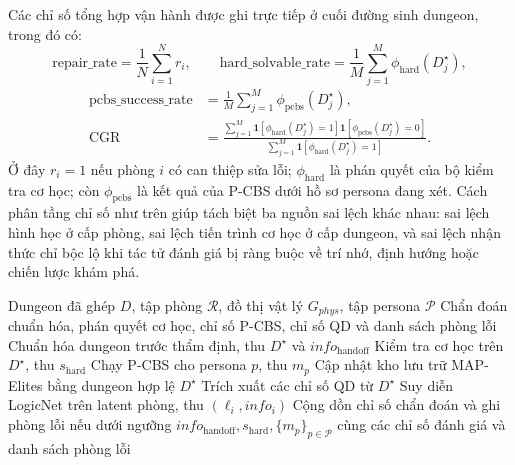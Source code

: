 \documentclass[oneside,a4paper,12pt]{extreport}
\begin{document}
Các chỉ số tổng hợp vận hành được ghi trực tiếp ở cuối đường sinh dungeon, trong đó có:
\begin{equation}
\mathrm{repair\_rate}=\frac{1}{N}\sum_{i=1}^{N} r_i,
\qquad
\mathrm{hard\_solvable\_rate}=\frac{1}{M}\sum_{j=1}^{M}\phi_{\mathrm{hard}}(D_j^{\star}),
\end{equation}
\begin{equation}
\begin{aligned}
\mathrm{pcbs\_success\_rate}
&=\frac{1}{M}\sum_{j=1}^{M}\phi_{\mathrm{pcbs}}(D_j^{\star}),\\
\mathrm{CGR}
&=
\frac{
\sum_{j=1}^{M}
\mathbf{1}\!\left[\phi_{\mathrm{hard}}(D_j^{\star})=1\right]
\mathbf{1}\!\left[\phi_{\mathrm{pcbs}}(D_j^{\star})=0\right]
}{
\sum_{j=1}^{M}\mathbf{1}\!\left[\phi_{\mathrm{hard}}(D_j^{\star})=1\right]
}.
\end{aligned}
\end{equation}
Ở đây $r_i=1$ nếu phòng $i$ có can thiệp sửa lỗi; $\phi_{\mathrm{hard}}$ là phán
quyết của bộ kiểm tra cơ học; còn $\phi_{\mathrm{pcbs}}$ là kết quả của P-CBS dưới
hồ sơ persona đang xét. Cách phân tầng chỉ số như trên giúp tách biệt ba nguồn
sai lệch khác nhau: sai lệch hình học ở cấp phòng, sai lệch tiến trình cơ học ở
cấp dungeon, và sai lệch nhận thức chỉ bộc lộ khi tác tử đánh giá bị ràng buộc
về trí nhớ, định hướng hoặc chiến lược khám phá.

\begin{algorithm}[H]
\caption{Đánh giá dungeon sau ghép với bước chuẩn hóa trước thẩm định, kiểm tra cơ học và P-CBS}
\label{alg:post_generation_evaluation}
\begin{algorithmic}[1]
\Require Dungeon đã ghép $D$, tập phòng $\mathcal{R}$, đồ thị vật lý $G_{phys}$, tập persona $\mathcal{P}$
\Ensure Chẩn đoán chuẩn hóa, phán quyết cơ học, chỉ số P-CBS, chỉ số QD và danh sách phòng lỗi
\State Chuẩn hóa dungeon trước thẩm định, thu $D^{\star}$ và $info_{\mathrm{handoff}}$
\State Kiểm tra cơ học trên $D^{\star}$, thu $s_{\mathrm{hard}}$
    \State Chạy P-CBS cho persona $p$, thu $m_p$
  \EndFor
    \State Cập nhật kho lưu trữ MAP-Elites bằng dungeon hợp lệ $D^{\star}$
    \State Trích xuất các chỉ số QD từ $D^{\star}$
  \EndIf
\EndIf
{}
    \State Suy diễn LogicNet trên latent phòng, thu $(\ell_i,info_i)$
    \State Cộng dồn chỉ số chẩn đoán và ghi phòng lỗi nếu dưới ngưỡng
  \EndFor
\EndIf
\State \Return $info_{\mathrm{handoff}}, s_{\mathrm{hard}}, \{m_p\}_{p\in\mathcal{P}}$ cùng các chỉ số đánh giá và danh sách phòng lỗi
\end{algorithmic}
\end{algorithm}
\end{document}
